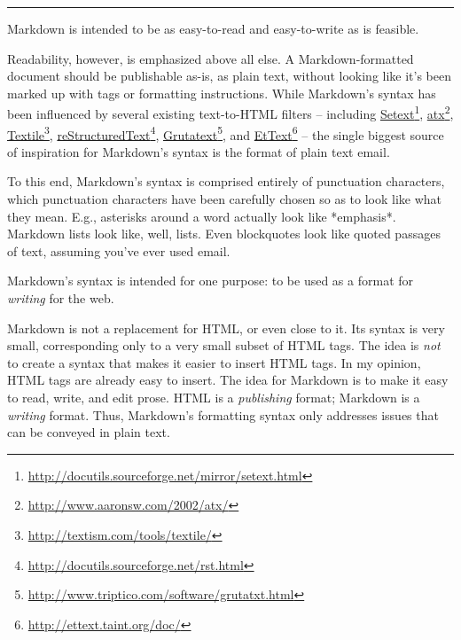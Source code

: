 \begin{center}\rule{3in}{0.4pt}\end{center}

Markdown is intended to be as easy-to-read and easy-to-write as is feasible.

Readability, however, is emphasized above all else. A Markdown-formatted
document should be publishable as-is, as plain text, without looking
like it's been marked up with tags or formatting instructions. While
Markdown's syntax has been influenced by several existing text-to-HTML
filters -- including \href{http://docutils.sourceforge.net/mirror/setext.html}{Setext}\footnote{\href{http://docutils.sourceforge.net/mirror/setext.html}{http://docutils.sourceforge.net/mirror/setext.html}}, \href{http://www.aaronsw.com/2002/atx/}{atx}\footnote{\href{http://www.aaronsw.com/2002/atx/}{http://www.aaronsw.com/2002/atx/}}, \href{http://textism.com/tools/textile/}{Textile}\footnote{\href{http://textism.com/tools/textile/}{http://textism.com/tools/textile/}}, \href{http://docutils.sourceforge.net/rst.html}{reStructuredText}\footnote{\href{http://docutils.sourceforge.net/rst.html}{http://docutils.sourceforge.net/rst.html}},
\href{http://www.triptico.com/software/grutatxt.html}{Grutatext}\footnote{\href{http://www.triptico.com/software/grutatxt.html}{http://www.triptico.com/software/grutatxt.html}}, and \href{http://ettext.taint.org/doc/}{EtText}\footnote{\href{http://ettext.taint.org/doc/}{http://ettext.taint.org/doc/}} -- the single biggest source of
inspiration for Markdown's syntax is the format of plain text email.

To this end, Markdown's syntax is comprised entirely of punctuation
characters, which punctuation characters have been carefully chosen so
as to look like what they mean. E.g., asterisks around a word actually
look like *emphasis*. Markdown lists look like, well, lists. Even
blockquotes look like quoted passages of text, assuming you've ever
used email.

Markdown's syntax is intended for one purpose: to be used as a
format for \emph{writing} for the web.

Markdown is not a replacement for HTML, or even close to it. Its
syntax is very small, corresponding only to a very small subset of
HTML tags. The idea is \emph{not} to create a syntax that makes it easier
to insert HTML tags. In my opinion, HTML tags are already easy to
insert. The idea for Markdown is to make it easy to read, write, and
edit prose. HTML is a \emph{publishing} format; Markdown is a \emph{writing}
format. Thus, Markdown's formatting syntax only addresses issues that
can be conveyed in plain text.

